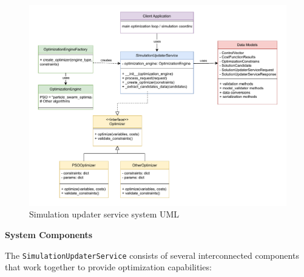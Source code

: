 \begin{figure}[H]
	\centering
	\includegraphics[width=1.0\textwidth]{content/images/SolutionUpdaterUML.pdf}
	\caption{Simulation updater service system UML}
	\label{fig:SolutionUpdaterServiceUML}
\end{figure}

\bigskip
\textbf{System Components}

The \texttt{SimulationUpdaterService} consists of several interconnected components that work together to provide optimization capabilities:

